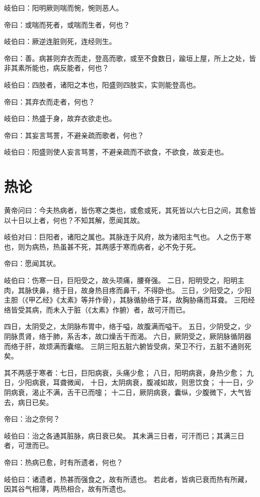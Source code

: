 \documentclass{article}%
\begin{document}
岐伯曰：阳明厥则喘而惋，惋则恶人。

帝曰：或喘而死者，或喘而生者，何也？

岐伯曰：厥逆连脏则死，连经则生。

帝曰：善。病甚则弃衣而走，登高而歌，或至不食数日，踰垣上屋，所上之处，皆非其素所能也，病反能者，何也？

岐伯曰：四肢者，诸阳之本也，阳盛则四肢实，实则能登高也。

帝曰：其弃衣而走者，何也？

岐伯曰：热盛于身，故弃衣欲走也。

帝曰：其妄言骂詈，不避亲疏而歌者，何也？

岐伯曰：阳盛则使人妄言骂詈，不避亲疏而不欲食，不欲食，故妄走也。


\section{热论}
黄帝问曰：今夫热病者，皆伤寒之类也，或愈或死，其死皆以六七日之间，其愈皆以十日以上者，何也？不知其解，愿闻其故。

岐伯对曰：巨阳者，诸阳之属也。其脉连于风府，故为诸阳主气也。
人之伤于寒也，则为病热，热虽甚不死，其两感于寒而病者，必不免于死。

帝曰：愿闻其状。

岐伯曰：伤寒一日，巨阳受之，故头项痛，腰脊强。
二日，阳明受之，阳明主肉，其脉侠鼻，络于目，故身热目疼而鼻干，不得卧也。
三日，少阳受之，少阳主胆（《甲乙经》《太素》等并作骨），其脉循胁络于耳，故胸胁痛而耳聋。
三阳经络皆受其病，而未入于脏（《太素》作腑）者，故可汗而已。

四日，太阴受之，太阴脉布胃中，络于嗌，故腹满而嗌干。
五日，少阴受之，少阴脉贯肾，络于肺，系舌本，故口燥舌干而渴。
六日，厥阴受之，厥阴脉循阴器而络于肝，故烦满而囊缩。
三阴三阳五脏六腑皆受病，荣卫不行，五脏不通则死矣。

其不两感于寒者：七日，巨阳病衰，头痛少愈；
八日，阳明病衰，身热少愈；
九日，少阳病衰，耳聋微闻，
十日，太阴病衰，腹减如故，则思饮食；
十一日，少阴病衰，渴止不满，舌干已而嚏；
十二日，厥阴病衰，囊纵，少腹微下，大气皆去，病日已矣。

帝曰：治之奈何？

岐伯曰：治之各通其脏脉，病日衰已矣。
其未满三日者，可汗而已；其满三日者，可泄而已。

帝曰：热病已愈，时有所遗者，何也？

岐伯曰：诸遗者，热甚而强食之，故有所遗也。
若此者，皆病已衰而热有所藏，因其谷气相薄，两热相合，故有所遗也。
\end{document}
